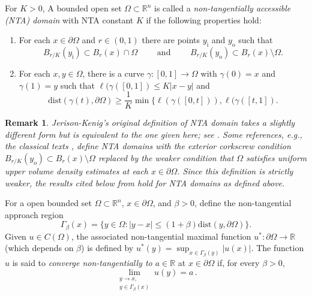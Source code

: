 \documentclass[10pt,a4paper]{amsart}
\numberwithin{equation}{section}
\newtheorem{remark}[theorem]{Remark}
\def\R{{\mathbb R}}
\def\W{\Omega}
\def\pa{{\partial}}
\begin{document}
For $K>0$,
A bounded open set $\W\subset \R^n$ is called a {\it non-tangentially accessible (NTA) domain}  with NTA constant $K$ if the following properties hold: 
\begin{enumerate}
    \item  For each $x \in \partial \W$ and $r \in (0,1)$ there are points $y_{\textrm{i}}$ and $y_{\textrm{o}}$ such that 
    \[
    B_{r/K}(y_{\textrm{i}}) \subset B_r(x) \cap \W  \qquad \text{ and } \qquad B_{r/K}(y_{\textrm{o}}) \subset B_r(x) \setminus \W .
    \]
    \item  For each  $x,y \in  \W$, there is a curve $\gamma : [0,1] \to \W$ with $\gamma(0)=x$ and $\gamma(1)=y$ such that $\ell(\gamma([0,1]) \leq K |x-y|$ and 
    $$\text{dist}(\gamma(t),\partial \W) \geq \frac{1}{K} \min\{ \ell(\gamma([0,t])), \ell(\gamma([t,1]).
    $$
\end{enumerate}
\begin{remark}
    {\rm 
    Jerison-Kenig's original definition of NTA domain  \cite{JKNTA} takes a slightly different form but is equivalent to the one given here; see \cite[Theorem 2.15]{ahmnt17}.
    Some references, e.g., the classical texts \cite{k94, CaffSalsa}, define NTA domains with the exterior corkscrew condition $B_{r/K}(y_{\textrm{o}}) \subset B_r(x) \setminus \W$ replaced by the weaker condition that $\Omega$ satisfies uniform upper volume density estimates at each $x\in \partial \W$. Since this definition is strictly weaker, the results cited below from \cite{k94}  hold for NTA domains as defined above. }
\end{remark}


For   a open bounded set $\W \subset \R^n$,  $x \in \partial \W$, and $\beta>0$, define the non-tangential approach region
\[
\Gamma_\beta(x)  = \{ y \in \W : |y-x| \leq (1+\beta) \text{dist}(y, \partial \W)\}.
\]
Given $u \in C(\Omega)$, the associated non-tangential maximal function $u^*:\pa \W \to \R$ (which depends on $\beta$) is defined by $u^*(y) = \sup_{x \in \Gamma_\beta(y)}|u(x)|$. The function $u$  is said to {\it converge non-tangentially to $a \in \R$} at $x \in \partial \Omega$ if, for every $\beta >0$, 
\begin{equation}\label{def: NTlimit 1}
\lim_{\substack{y \to x ,\\ 
y \in \Gamma_\beta(x)  }} u(y) = a\,.
\end{equation}
\end{document}
